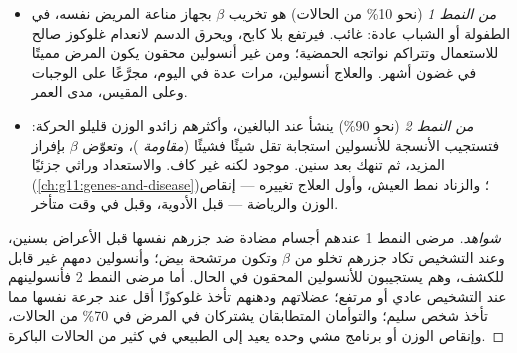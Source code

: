 \begin{proposition}\label{prop:g12:glucose-and-diabetes:types}
\begin{itemize}
  \item \emph{ من النمط 1} (نحو 10\% من الحالات) هو تخريب
         $\beta$ بجهاز مناعة المريض نفسه، في الطفولة أو الشباب
        عادة:  غائب. فيرتفع  بلا كابح، ويحرق الدسم
        لانعدام غلوكوز صالح للاستعمال وتتراكم نواتجه الحمضية؛ ومن غير
        أنسولين محقون يكون المرض مميتًا في غضون أشهر. والعلاج أنسولين،
        مرات عدة في اليوم، مجرَّعًا على الوجبات وعلى  المقيس،
        مدى العمر.
  \item \emph{ من النمط 2} (نحو 90\%) ينشأ عند البالغين،
        وأكثرهم زائدو الوزن قليلو الحركة: فتستجيب الأنسجة للأنسولين
        استجابة تقل شيئًا فشيئًا (\emph{مقاومة })، وتعوّض
         $\beta$ بإفراز المزيد، ثم تنهك بعد سنين. 
        موجود لكنه غير كاف. والاستعداد وراثي جزئيًا
        (\cref{ch:g11:genes-and-disease})؛ والزناد نمط العيش، وأول
        العلاج تغييره --- إنقاص الوزن والرياضة --- قبل الأدوية،
        وقبل  في وقت متأخر.
\end{itemize}
\end{proposition}
\begin{proof}[شواهد]
مرضى النمط 1 عندهم أجسام مضادة ضد  جزرهم نفسها قبل الأعراض بسنين، وعند
التشخيص تكاد جزرهم تخلو من  $\beta$ وتكون مرتشحة  بيض؛
وأنسولين دمهم غير قابل للكشف، وهم يستجيبون للأنسولين المحقون في الحال.
أما مرضى النمط 2 فأنسولينهم عند التشخيص عادي أو مرتفع؛  عضلاتهم
ودهنهم تأخذ غلوكوزًا أقل عند جرعة  نفسها مما تأخذ  شخص
سليم؛ والتوأمان المتطابقان يشتركان في المرض في 70\% من الحالات، وإنقاص
الوزن أو برنامج مشي وحده يعيد  إلى الطبيعي في كثير من الحالات
الباكرة.
\end{proof}

